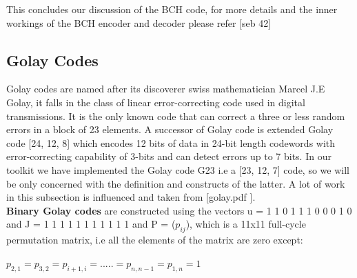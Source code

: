 This concludes our discussion of the BCH code, for more details and the inner workings of the BCH encoder and decoder please refer [seb 42]

\subsection{Golay Codes}
\label{golay_related}
Golay codes are named after its discoverer swiss mathematician Marcel J.E Golay, it falls in the class of linear error-correcting code used in digital transmissions. It is the only known code that can correct a three or less random errors in a block of 23 elements. A successor of Golay code is extended Golay code [24, 12, 8] which encodes 12 bits of data in 24-bit length codewords with error-correcting capability of 3-bits and can detect errors up to 7 bits. In our toolkit we have implemented
the Golay code G23 i.e a [23, 12, 7] code, so we will be only concerned with the definition and constructs of the latter. A lot of work in this subsection is influenced and taken from [golay.pdf ].\\

\textbf{Binary Golay codes} are constructed using the vectors u = 1 1 0 1 1 1 0 0 0 1 0 and J = 1 1 1 1 1 1 1 1 1 1 1 and P = ($p_{ij}$), which is a 11x11 full-cycle permutation matrix, i.e all the elements of the matrix are zero except:

\tab \tab \tab $p_{2,1} = p_{3,2} = p_{i+1,i} = . . . . . = p_{n,n-1} = p_{1,n} = 1$

